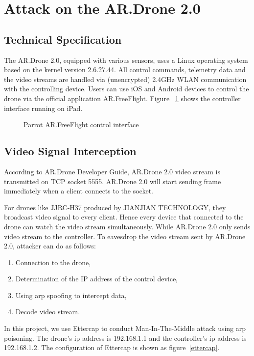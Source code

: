 \documentclass{acm_proc_article-sp}
\begin{document}
\section{Attack on the AR.Drone 2.0}

\subsection{Technical Specification}
The AR.Drone 2.0, equipped with various sensors, uses a Linux operating system based on the kernel version 2.6.27.44. All control commands, telemetry data and the video streams are handled via (unencrypted) 2.4GHz WLAN communication with the controlling device. Users can use iOS and Android devices to control the drone via the official application AR.FreeFlight. Figure ~\ref{iPad} shows the controller interface running on iPad.

\begin{figure}
\centering
{}
\caption{Parrot AR.FreeFlight control interface}
\label{iPad}
\end{figure}

\subsection{Video Signal Interception}

According to AR.Drone Developer Guide\cite{dev:guide}, AR.Drone 2.0 video stream is transmitted on TCP socket 5555. AR.Drone 2.0 will start sending frame immediately when a client connects to the socket. 

For drones like JJRC-H37 produced by JIANJIAN TECHNOLOGY, they broadcast video signal to every client. Hence every device that connected to the drone can watch the video stream simultaneously. While AR.Drone 2.0 only sends video stream to the controller. To eavesdrop the video stream sent by AR.Drone 2.0, attacker can do as follows:

\begin{enumerate}
  \item Connection to the drone,
  \item Determination of the IP address of the control device,
  \item Using arp spoofing to intercept data,
  \item Decode video stream.
\end{enumerate}

In this project, we use Ettercap\cite{ettercap} to conduct Man-In-The-Middle attack using arp poisoning. The drone's ip address is 192.168.1.1 and the controller's ip address is 192.168.1.2. The configuration of Ettercap is shown as figure~\ref{ettercap}.
\end{document}
